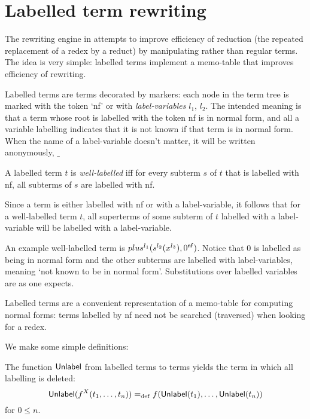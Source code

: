 \def\UNLABEL{\mbox{\sf Unlabel}}
\def\TICK{\mbox{\sf V-L}}
\def\t#1{#1^{\_}}
\def\tc#1#2{#2^{#1}}

\section {Labelled term rewriting}
\label {labelled}
 
\def\nf{{\sf nf}} The rewriting engine in \clam attempts to improve
efficiency of reduction (the repeated replacement of a redex by a
reduct) by manipulating  rather than regular
terms.  The idea is very simple: labelled terms implement a memo-table
that improves efficiency of rewriting.


Labelled terms are terms decorated by markers: each node in the term
tree is marked with the token `\nf' or with {\em label-variables\/}
$l_1$, $l_2$.  The intended meaning is that a term whose root is
labelled with the token \nf{} is in normal form, and all a variable
labelling indicates that it is not known if that term is in normal
form.  When the name of a label-variable doesn't matter, it will be
written anonymously, $\_$

\begin{defn}
A labelled term $t$ is {\em well-labelled\/} iff for every subterm $s$ 
of $t$ that is labelled with \nf{}, all subterms of $s$ are labelled
with \nf{}.
\end{defn}
Since a term is either labelled with \nf{} or with a label-variable,
it follows that for a well-labelled term $t$, all superterms of some
subterm of $t$ labelled with a label-variable will be labelled with a
label-variable.

An example well-labelled term is $plus^{l_1}(s^{l_2}(x^{l_3}),0^\nf)$.
Notice that $0$ is labelled as being in normal form and the other
subterms are labelled with label-variables, meaning `not known to be
in normal form'.  Substitutions over labelled variables are as one
expects.

Labelled terms are a convenient representation of a memo-table
for computing normal forms: terms labelled by \nf{} need not be
searched (traversed) when looking for a redex.  

We make some simple definitions:
\begin{defn}[\UNLABEL]
The function $\UNLABEL$ from labelled terms to terms yields the term in
which all labelling is deleted:
\[
\UNLABEL(f^X(t_1,\ldots,t_n)) =_{\rm def} f(\UNLABEL(t_1),\ldots,\UNLABEL(t_n))
\]
for $0\leq n$.
\end{defn}


